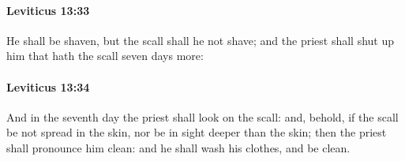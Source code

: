 		\paragraph{Leviticus 13:33} %
			\label{LEVITICUS-13-33}

			He shall be shaven, but the scall shall he not shave; and the priest shall shut up him that hath the scall seven days more:


		\paragraph{Leviticus 13:34} %
			\label{LEVITICUS-13-34}

			And in the seventh day the priest shall look on the scall: and, behold, if the scall be not spread in the skin, nor be in sight deeper than the skin; then the priest shall pronounce him clean: and he shall wash his clothes, and be clean.

